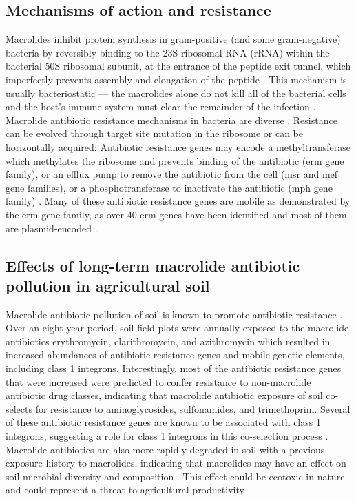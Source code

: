 \subsection{Mechanisms of action and resistance}

Macrolides inhibit protein synthesis in gram-positive (and some gram-negative) bacteria by reversibly binding to the 23S ribosomal RNA (rRNA) within the bacterial 50S ribosomal subunit, at the entrance of the peptide exit tunnel, which imperfectly prevents assembly and elongation of the peptide \parencite{CapeloMartinez.2019, Fyfe.2016}.
This mechanism is usually bacteriostatic --- the macrolides alone do not kill all of the bacterial cells and the host’s immune system must clear the remainder of the infection \parencite{Pankey.2004}.
Macrolide antibiotic resistance mechanisms in bacteria are diverse \parencite{Fyfe.2016}.
Resistance can be evolved through target site mutation in the ribosome or can be horizontally acquired:
Antibiotic resistance genes may encode a methyltransferase which methylates the ribosome and prevents binding of the antibiotic (erm gene family), or an efflux pump to remove the antibiotic from the cell (msr and mef gene families), or a phosphotransferase to inactivate the antibiotic (mph gene family) \parencite{Fyfe.2016}.
Many of these antibiotic resistance genes are mobile as demonstrated by the erm gene family, as over 40 erm genes have been identified and most of them are plasmid-encoded \parencite{Alcock.2020, Leclercq.2002}.

\subsection{Effects of long-term macrolide antibiotic pollution in agricultural soil}

Macrolide antibiotic pollution of soil is known to promote antibiotic resistance \parencite{Lau.2020}.
Over an eight-year period, soil field plots were annually exposed to the macrolide antibiotics erythromycin, clarithromycin, and azithromycin which resulted in increased abundances of antibiotic resistance genes and mobile genetic elements, including class 1 integrons.
Interestingly, most of the antibiotic resistance genes that were increased were predicted to confer resistance to non-macrolide antibiotic drug classes, indicating that macrolide antibiotic exposure of soil co-selects for resistance to aminoglycosides, sulfonamides, and trimethoprim.
Several of these antibiotic resistance genes are known to be associated with class 1 integrons, suggesting a role for class 1 integrons in this co-selection process \parencite{Lau.2020}.
Macrolide antibiotics are also more rapidly degraded in soil with a previous exposure history to macrolides, indicating that macrolides may have an effect on soil microbial diversity and composition \parencite{Topp.2016}.
This effect could be ecotoxic in nature and could represent a threat to agricultural productivity \parencite{Prashar.2014}.


